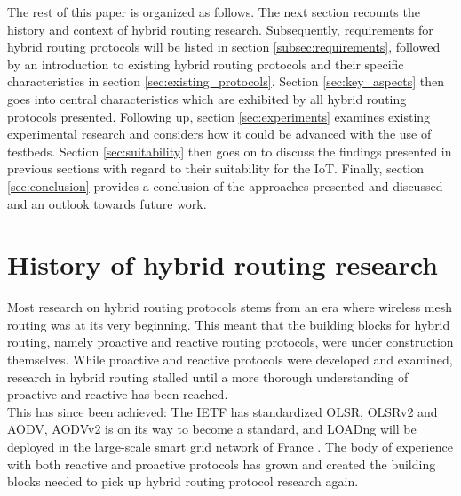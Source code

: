 \documentclass[a4paper,10pt]{scrartcl}
\begin{document}
The rest of this paper is organized as follows.
The next section recounts the history and context of hybrid routing research. Subsequently, requirements for hybrid routing protocols will be listed in section \ref{subsec:requirements}, followed by an introduction to existing hybrid routing protocols and their specific characteristics in section \ref{sec:existing_protocols}. Section \ref{sec:key_aspects} then goes into central characteristics which are exhibited by all hybrid routing protocols presented. Following up, section \ref{sec:experiments} examines existing experimental research and considers how it could be advanced with the use of testbeds. Section \ref{sec:suitability} then goes on to discuss the findings presented in previous sections with regard to their suitability for the IoT. Finally, section \ref{sec:conclusion} provides a conclusion of the approaches presented and discussed and an outlook towards future work.

\section{History of hybrid routing research}
\label{sec:related_work}
Most research on hybrid routing protocols stems from an era where wireless mesh routing was at its very beginning. This meant that the building blocks for hybrid routing, namely proactive and reactive routing protocols, were under construction themselves. While proactive and reactive protocols were developed and examined, research in hybrid routing stalled until a more thorough understanding of proactive and reactive has been reached.\\
This has since been achieved: The \gls{IETF} has standardized \gls{OLSR}\cite{RFC-3626}, OLSRv2\cite{RFC-7181} and \gls{AODV}\cite{RFC-3561}, AODVv2\cite{draft-ietf-manet-aodvv2-06} is on its way to become a standard, and \gls{LOADng}\cite{draft-yi-loadngct-02} will be deployed in the large-scale smart grid network of France \cite{X800}. The body of experience with both reactive and proactive protocols has grown and created the building blocks needed to pick up hybrid routing protocol research again.\\
\end{document}
